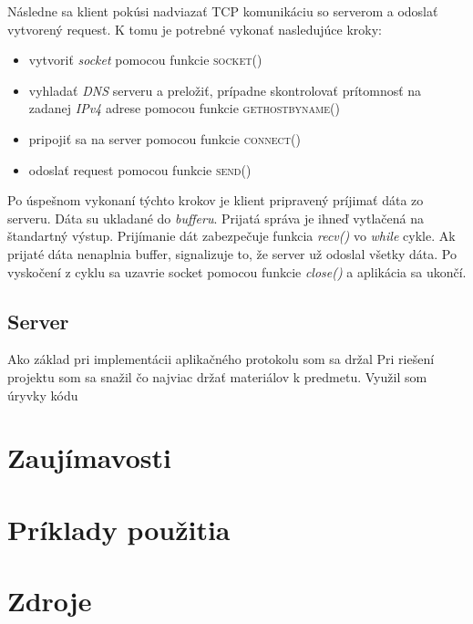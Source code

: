 \documentclass[a4paper, 11pt]{article}
\begin{document}
Následne sa klient pokúsi nadviazať TCP komunikáciu so serverom a odoslať vytvorený request. K tomu je potrebné vykonať nasledujúce kroky:
\begin{itemize}
\item vytvoriť \emph{socket} pomocou funkcie \textsc{socket()}
\item vyhladať \emph{DNS} serveru a preložiť, prípadne skontrolovať prítomnosť na zadanej \emph{IPv4} adrese pomocou funkcie \textsc{gethostbyname()}
\item pripojiť sa na server pomocou funkcie \textsc{connect()}
\item odoslať request pomocou funkcie \textsc{send()}
\end{itemize}

Po úspešnom vykonaní týchto krokov je klient pripravený príjimať dáta zo serveru. Dáta su ukladané do \emph{bufferu}. Prijatá správa je ihneď vytlačená na štandartný výstup. Prijímanie dát zabezpečuje funkcia \emph{recv()} vo \emph{while} cykle. Ak prijaté dáta nenaplnia buffer, signalizuje to, že server už odoslal všetky dáta. Po vyskočení z cyklu sa uzavrie socket pomocou funkcie \emph{close()} a aplikácia sa ukončí.

\subsection{Server}
Ako základ pri implementácii aplikačného protokolu som sa držal 
Pri riešení projektu som sa snažil čo najviac držať materiálov k predmetu. Využil som úryvky kódu 
\section{Zaujímavosti}
\section{Príklady použitia}
\section{Zdroje}
\end{document}
